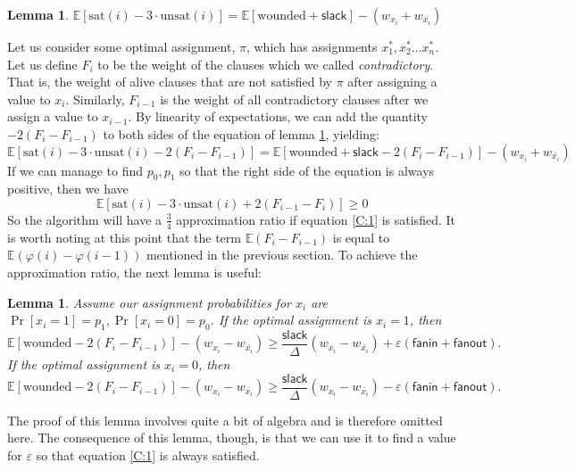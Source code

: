\documentclass[11pt,letter]{article}
\newtheorem{lemma}[theorem]{Lemma}
\numberwithin{theorem}{section}
\renewcommand{\phi}{\varphi}
\begin{document}
\begin{lemma} \label{L:2}
$\mathbb{E}[\textrm{sat}(i) - 3\cdot\textrm{unsat}(i)] = \mathbb{E}[\textrm{wounded} + \mathsf{slack}] - (w_{x_i} + w_{\bar{x_i}})$
\end{lemma}
Let us consider some optimal assignment, $\pi$, which has assignments $x_1^*, x_2^* \ldots x_n^*$. Let us define $F_i$ to be the weight of the clauses which we called \emph{contradictory}. That is, the weight of alive clauses that are not satisfied by $\pi$ after assigning a value to $x_i$. Similarly, $F_{i-1}$ is the weight of all contradictory clauses  after we assign a value to $x_{i-1}$. By linearity of expectations, we can add the quantity $-2(F_{i}-F_{i-1})$ to both sides of the equation of lemma \ref{L:2}, yielding:
\begin{equation}
\mathbb{E}[\textrm{sat}(i) - 3\cdot\textrm{unsat}(i) - 2(F_{i}-F_{i-1})] = \mathbb{E}[\textrm{wounded} + \mathsf{slack} - 2(F_{i}-F_{i-1})] - (w_{x_i} + w_{\bar{x_i}})
\end{equation}
If we can manage to find $p_0,p_1$ so that the right side of the equation is always positive, then we have
\begin{equation}
\mathbb{E}[\textrm{sat}(i) - 3\cdot\textrm{unsat}(i)+ 2(F_{i-1}-F_i)] \ge 0 \label{C:1}
\end{equation}
So the algorithm will have a $\frac{3}{4}$ approximation ratio if equation \ref{C:1} is satisfied. It is worth noting at this
point that the term $\mathbb{E}(F_{i}-F_{i-1})$ is equal to
$\mathbb{E}(\phi(i) - \phi(i-1))$ mentioned in the previous section. To achieve the approximation ratio, the next lemma is useful:
\begin{lemma} \label{L:3}
Assume our assignment probabilities for $x_i$ are $\Pr[x_i = 1] = p_1, \Pr[x_i =0] = p_0$. If the optimal assignment is $x_i =1$, then
\[\mathbb{E}[\textrm{wounded} - 2(F_{i}-F_{i-1})] - (w_{x_i} - w_{\bar{x_i}}) \ge \frac{\mathsf{slack}}{\Delta}(w_{x_i} - w_{\bar{x_i}}) + \varepsilon(\mathsf{fanin} + \mathsf{fanout}).\]
If the optimal assignment is  $x_i=0$, then
\[\mathbb{E}[\textrm{wounded} - 2(F_{i}-F_{i-1})] - (w_{x_i} - w_{\bar{x_i}}) \ge \frac{\mathsf{slack}}{\Delta}(w_{x_i} - w_{\bar{x_i}}) - \varepsilon(\mathsf{fanin} + \mathsf{fanout}).\]
\end{lemma}
The proof of this lemma involves quite a bit of algebra and is therefore omitted here. The consequence of this lemma, though, is that we can use it to find a value for $\varepsilon$ so that equation \ref{C:1} is always satisfied.
\end{document}
